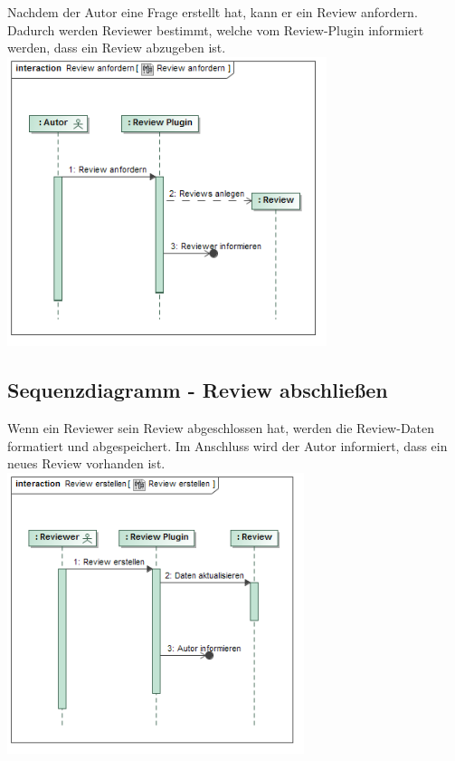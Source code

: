 \documentclass[a4paper]{scrreprt}
\begin{document}
Nachdem der Autor eine Frage erstellt hat, kann er ein Review anfordern. Dadurch werden Reviewer bestimmt, welche vom Review-Plugin informiert werden, dass ein Review abzugeben ist.\\

\includegraphics[width=0.7\textwidth]{Sequence_Diagram__Review_anfordern__Review_anfordern.png}
\label{Review anfordern}

\newpage

\subsection{Sequenzdiagramm - Review abschließen}

Wenn ein Reviewer sein Review abgeschlossen hat, werden die Review-Daten formatiert und abgespeichert. Im Anschluss wird der Autor informiert, dass ein neues Review vorhanden ist.\\

\includegraphics[width=0.65\textwidth]{Sequence_Diagram__Review_erstellen__Review_erstellen.png}
\label{Review beenden}
\end{document}
